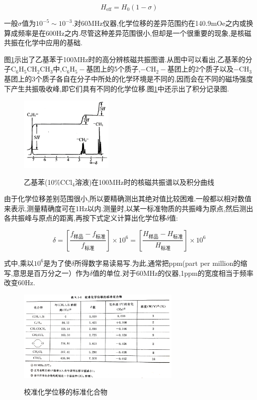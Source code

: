\documentclass[a4paper]{article}
\begin{document}
\begin{equation}H_\text{eff}=H_0(1-\sigma)\label{9.1-15}\end{equation}

一般$\sigma$值为$10^{-5}\sim10^{-3}$.对60MHz仪器,化学位移的差异范围约在140.9mOe之内或换算成频率是在600Hz之内.尽管这种差异范围很小,但却是一个很重要的现象,是核磁共振在化学中应用的基础.

图\ref{Fig3}示出了乙基苯于100MHz时的高分辨核磁共振图谱.从图中可以看出,乙基苯的分子$\text{C}_6\text{H}_5\text{C}\text{H}_2\text{C}\text{H}_3$中,$\text{C}_6\text{H}_5-$基团上的5个质子,$-\text{C}\text{H}_2-$基团上的2个质子以及$-\text{C}\text{H}_3$基团上的3个质子各自在分子中所处的化学环境是不同的,因而会在不同的磁场强度下产生共振吸收峰,即它们具有不同的化学位移.图\ref{Fig3}中还示出了积分记录图.

\begin{figure}[H]
\centering
\includegraphics[width = 0.4\textwidth]{fig/3.png}\\
\caption{乙基苯(10\%CCl$_4$溶液)在100MHz时的核磁共振谱以及积分曲线}
\label{Fig3}
\end{figure}

由于化学位移差别范围很小,所以要精确测出其绝对值比较困难.一般都以相对数值来表示,测量精确度可在1Hz以内.测量时,以某一标准物质的共振峰为原点,然后测出各共振峰与原点的距离,再按下式定义计算出化学位移$\delta$值:

\begin{equation}\delta=\left[\frac{f_\text{样品}-f_\text{标准}}{f_\text{标准}}\right]\times 10^6=\left[\frac{H_\text{样品}-H_\text{标准}}{H_\text{标准}}\right]\times 10^6\end{equation}

式中,乘以$10^6$是为了使$\delta$所得数字易读易写.为此,通常把ppm(part per million的缩写,意思是百万分之一）作为$\delta$值的单位.对于60MHz的仪器,1ppm的宽度相当于频率改变60Hz.

\begin{figure}[H]
\centering
\includegraphics[width = 0.7\textwidth]{fig/4.png}\\
\caption{校准化学位移的标准化合物}
\label{Tab1}
\end{figure}
\end{document}

